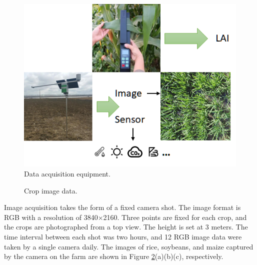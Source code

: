 \documentclass[acmsmall,manuscript, screen, review]{acmart}
\begin{document}
\begin{figure}[htbp]
  \centering
  \includegraphics[width=0.5\linewidth]{pic/data_acquisition_equipment.png}
  \caption{Data acquisition equipment.}
  \label{data_collection_equipment}
\end{figure}
\begin{figure}[htbp]
  \centering
  \hfill
  \caption{Crop image data.}
  \label{crop} 
\end{figure}



Image acquisition takes the form of a fixed camera shot. The image format is RGB with a resolution of 3840\begin{math}
  \times
\end{math}2160. Three points are fixed for each crop, and the crops are photographed from a top view. The height is set at 3 meters. The time interval between each shot was two hours, and 12 RGB image data were taken by a single camera daily. The images of rice, soybeans, and maize captured by the camera on the farm are shown in Figure \ref{crop}(a)(b)(c), respectively.
\end{document}
